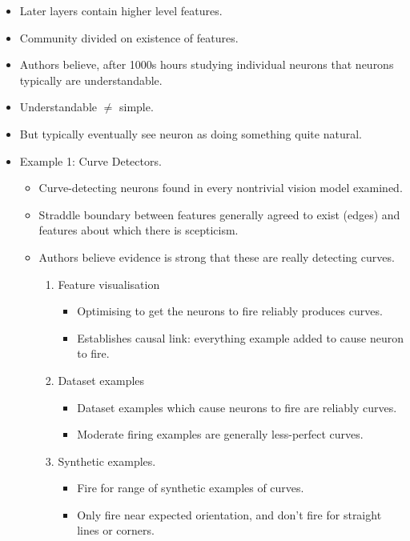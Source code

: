 \begin{itemize}
    \item Later layers contain higher level features.
    \item Community divided on existence of features.
    \item Authors believe, after 1000s hours studying individual neurons that neurons typically are understandable.
    \item Understandable $\neq$ simple.
    \item But typically eventually see neuron as doing something quite natural.
    \item Example 1: Curve Detectors.
    \begin{itemize}
        \item Curve-detecting neurons found in every nontrivial vision model examined.
        \item Straddle boundary between features generally agreed to exist (edges) and features about which there is scepticism.
        \item Authors believe evidence is strong that these are really detecting curves.
        \begin{enumerate}[label={\bfseries Argument \arabic*.}, leftmargin=*, labelindent=3pt]
            \item Feature visualisation
            \begin{itemize}[leftmargin=-30pt]
                \item Optimising to get the neurons to fire reliably produces curves.
                \item Establishes causal link: everything example added to cause neuron to fire.
            \end{itemize}
            \item Dataset examples
            \begin{itemize}[leftmargin=-30pt]
                \item Dataset examples which cause neurons to fire are reliably curves.
                \item Moderate firing examples are generally less-perfect curves.
            \end{itemize}
            \item Synthetic examples.
            \begin{itemize}[leftmargin=-30pt]
                \item Fire for range of synthetic examples of curves.
                \item Only fire near expected orientation, and don't fire for straight lines or corners.

\end{itemize}
\end{enumerate}
\end{itemize}
\end{itemize}
